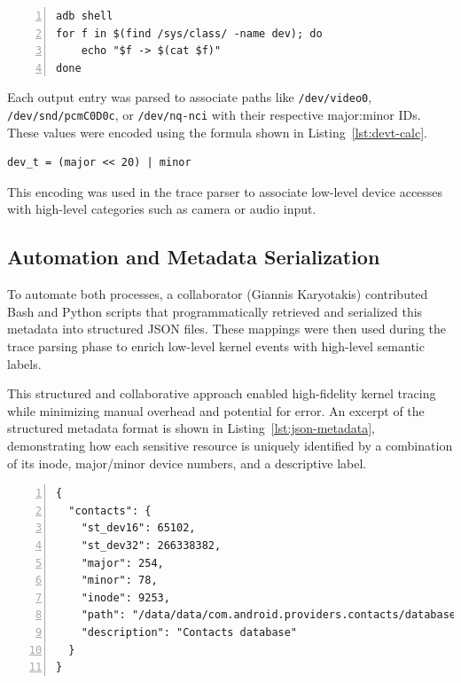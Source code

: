\documentclass[a4paper,12pt]{report}
\begin{document}
\begin{lstlisting}[caption={Enumerating character and block devices with major:minor IDs},label={lst:device-node-scan},numbers=left]
adb shell
for f in $(find /sys/class/ -name dev); do
    echo "$f -> $(cat $f)"
done
\end{lstlisting}

Each output entry was parsed to associate paths like \texttt{/dev/video0}, \texttt{/dev/snd/pcmC0D0c}, or \texttt{/dev/nq-nci} with their respective major:minor IDs. These values were encoded using the formula shown in Listing~\ref{lst:devt-calc}.

\begin{lstlisting}[caption={Encoding device number using major and minor},label={lst:devt-calc},numbers=none]
dev_t = (major << 20) | minor
\end{lstlisting}

This encoding was used in the trace parser to associate low-level device accesses with high-level categories such as camera or audio input.

\subsection{Automation and Metadata Serialization}

To automate both processes, a collaborator (Giannis Karyotakis) contributed Bash and Python scripts that programmatically retrieved and serialized this metadata into structured JSON files. These mappings were then used during the trace parsing phase to enrich low-level kernel events with high-level semantic labels.

This structured and collaborative approach enabled high-fidelity kernel tracing while minimizing manual overhead and potential for error.
An excerpt of the structured metadata format is shown in Listing~\ref{lst:json-metadata}, demonstrating how each sensitive resource is uniquely identified by a combination of its inode, major/minor device numbers, and a descriptive label.

\begin{lstlisting}[caption={Serialized JSON metadata for sensitive resource mapping},label={lst:json-metadata},numbers=left]
{
  "contacts": {
    "st_dev16": 65102,
    "st_dev32": 266338382,
    "major": 254,
    "minor": 78,
    "inode": 9253,
    "path": "/data/data/com.android.providers.contacts/databases/contacts2.db",
    "description": "Contacts database"
  }
}
\end{lstlisting}
\end{document}
